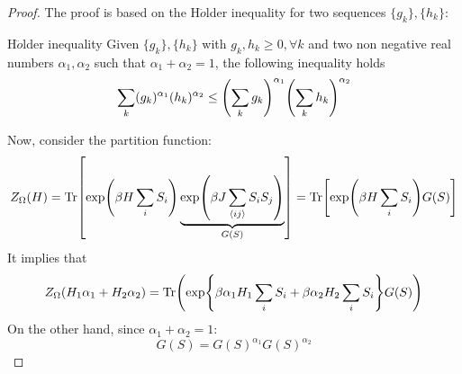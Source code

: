 \documentclass[../main/main.tex]{subfiles}
\begin{document}
\begin{proof}
The proof is based on the H$\ddot{o}$lder inequality for two sequences  \( \{ g_k \}, \{ h_k \}     \):

  \begin{definition}{H$\ddot{o}$lder inequality}{}
    Given  \( \{ g_k \}, \{ h_k \}     \) with \( g_k,h_k \ge 0, \forall k \) and two non negative real numbers \( \alpha _1, \alpha _2 \) such that \( \alpha _1 + \alpha _2 =1 \), the following inequality holds
    \begin{equation}
      \sum_{k}^{} (g_k)^{\alpha _1} (h_k)^{\alpha _2} \le \qty(\sum_{k}^{} g_k )^{\alpha _1} \qty(\sum_{k}^{} h_k )^{\alpha _2}
    \end{equation}
  \end{definition}

Now, consider the partition function:
\begin{equation*}
  Z_ \Omega  (H) = \Tr[\exp (\beta H \sum_{i}^{} S_i ) \underbrace{\exp (\beta J \sum_{\expval{ij} }^{} S_i S_j ) }_{G (S)}  ] = \Tr [\exp (\beta H \sum_{i}^{} S_i ) G (S)]
\end{equation*}
It implies that
\begin{equation*}
  Z_ \Omega  (H_1 \alpha _1 + H_2 \alpha _2) = \Tr(\exp {\beta \alpha _1 H_1 \sum_{i}^{} S_i + \beta \alpha _2 H_2 \sum_{i}^{} S_i} G(S))
\end{equation*}
On the other hand, since \( \alpha _1 + \alpha _2 =1 \):
\begin{equation*}
  G (S) = G (S)^{\alpha _1} G(S)^{\alpha _2}
\end{equation*}


\end{proof}
\end{document}
